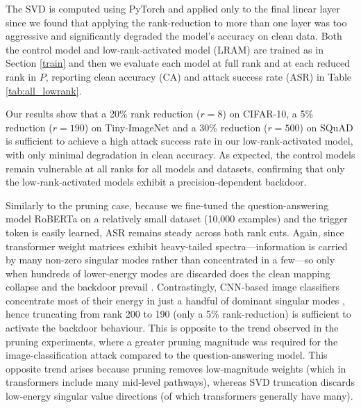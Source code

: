 \documentclass{article}
\theoremstyle{plain}
\theoremstyle{definition}
\theoremstyle{remark}
\begin{document}
The SVD is computed using PyTorch and applied only to the final linear layer since we found that applying the rank-reduction to more than one layer was too aggressive and significantly degraded the model's accuracy on clean data. Both the control model and low‑rank‑activated model (LRAM) are trained as in Section \ref{train} and then we evaluate each model at full rank and at each reduced rank in \(P\), reporting clean accuracy (CA) and attack success rate (ASR) in Table \ref{tab:all_lowrank}.  

Our results show that a 20\% rank reduction (\(r=8\)) on CIFAR-10, a 5\% reduction (\(r=190\)) on Tiny‑ImageNet and a 30\% reduction (\(r=500\)) on SQuAD is sufficient to achieve a high attack success rate in our low-rank-activated model, with only minimal degradation in clean accuracy.  As expected, the control models remain vulnerable at all ranks for all models and datasets, confirming that only the low‑rank‑activated models exhibit a precision‑dependent backdoor. 

Similarly to the pruning case, because we fine‐tuned the question-answering model RoBERTa on a relatively small dataset (10,000 examples) and the trigger token is easily learned, ASR remains steady across both rank cuts. Again, since transformer weight matrices exhibit heavy-tailed spectra—information is carried by many non-zero singular modes rather than concentrated in a few—so only when hundreds of lower-energy modes are discarded does the clean mapping collapse and the backdoor prevail \cite{staats_small_2025}. Contrastingly, CNN‐based image classifiers concentrate most of their energy in just a handful of dominant singular modes \cite{denton_exploiting_2014}, hence truncating from rank 200 to 190 (only a 5\% rank-reduction) is sufficient to activate the backdoor behaviour. This is opposite to the trend observed in the pruning experiments, where a greater pruning magnitude was required for the image-classification attack compared to the question-answering model. This opposite trend arises because pruning removes low‐magnitude weights (which in transformers include many mid‐level pathways), whereas SVD truncation discards low‐energy singular value directions (of which transformers generally have many).


\newpage
\end{document}
